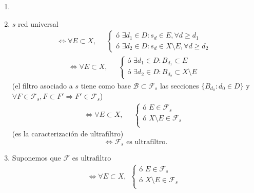 \begin{dem}
  \begin{enumerate}[label=(\roman*)]
    \item []
    \item $s$ red universal
      \[ 
        \Leftrightarrow \forall E \subset X, \quad
        \begin{aligned}
          \begin{cases}
            \text{ó } \exists d_{1} \in D : s_{d} \in E, \forall d \geq d_{1} \\
            \text{ó } \exists d_{2} \in D : s_{d} \in X \setminus E, \forall d \geq d_{2}
          \end{cases}
        \end{aligned} 
      \] 
      \[ 
        \Leftrightarrow \forall E \subset X, \quad
        \begin{aligned}
          \begin{cases}
            \text{ó } \exists d_{1} \in D : B_{d_{1}} \subset E \\
            \text{ó } \exists d_{2} \in D : B_{d_{2}} \subset X \setminus E
          \end{cases}
        \end{aligned} 
      \] 
      (el filtro asociado a $s$ tiene como base $\mathcal{B} \subset \mathcal{F}_{s}$ las secciones $\{ B_{d_{0}} : d_{0} \in D \}$ y $\forall F \in \mathcal{F}_{s}, F \subset F' \Rightarrow F' \in \mathcal{F}_{s}$)
      \[ 
        \Leftrightarrow \forall E \subset X, \quad
        \begin{aligned}
          \begin{cases}
            \text{ó } E \in \mathcal{F}_{s} \\
            \text{ó } X \setminus E \in \mathcal{F}_{s} \\
          \end{cases}
        \end{aligned} 
      \] 
      (es la caracterización de ultrafiltro)
      \[ 
        \Leftrightarrow \mathcal{F}_{s} \text{ es ultrafiltro}.
      \] 
    \item Suponemos que $\mathcal{F}$ es ultrafiltro
      \[ 
        \Leftrightarrow \forall E \subset X,
        \begin{aligned}
          \begin{cases}
            \text{ó } E \in \mathcal{F}_{s} \\
            \text{ó } X \setminus E \in \mathcal{F}_{s} \\

\end{cases}
\end{aligned}\]
\end{enumerate}
\end{dem}
